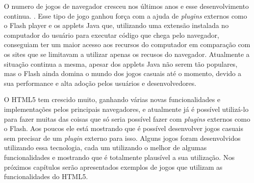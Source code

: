 O numero de jogos de navegador cresceu nos últimos anos e esse
desenvolvimento continua. \cite{ozcan2010recent}. Esse tipo de jogo
ganhou força com a ajuda de \textit{plugins}  externos como o Flash player e
os applets Java que, utilizando uma extensão instalada no computador
do usuário para executar código que chega pelo navegador,
conseguiam ter um maior acesso aos recursos do
computador em comparação com os sites que se limitavam a utilizar
apenas os recusos do navegador.
Atualmente a situação continua a mesma, apesar dos applets Java não
serem tão populares, mas o Flash ainda domina o mundo dos jogos
casuais até o momento, devido a sua performance e alta adoção pelos
usuários e desenvolvedores.

O HTML5 tem crescido muito, ganhando várias novas funcionalidades e
implementações pelos principais navegadores, e atualmente já é possível utilizá-lo
para fazer muitas das coisas que só seria possível fazer com \textit{plugins}
externos como o Flash. Aos poucos ele está mostrando que é possível
desenvolver jogos casuais sem precisar de um \textit{plugin} externo para isso.
Alguns jogos foram desenvolvidos utilizando essa tecnologia, cada um
utilizando o melhor de algumas funcionalidades e mostrando que é
totalmente plausível a sua utilização. Nos próximos capítulos serão
apresentados exemplos de jogos que utilizam as funcionalidades do HTML5.
